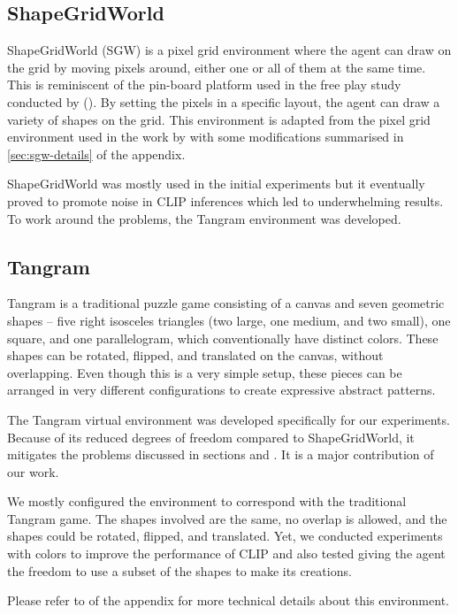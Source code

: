 \subsection{ShapeGridWorld}
\label{sec:sgw}
ShapeGridWorld (SGW) is a pixel grid environment where the agent can draw on the grid by moving pixels around, either one or all of them at the same time.
This is reminiscent of the pin-board platform used in the free play study conducted by \citet{diggs} ().
By setting the pixels in a specific layout, the agent can draw a variety of shapes on the grid.
This environment is adapted from the pixel grid environment used in the work by \citet{rair} with some modifications summarised in \ref{sec:sgw-details} of the appendix.

ShapeGridWorld was mostly used in the initial experiments but it eventually proved to promote noise in CLIP inferences which led to underwhelming results.
To work around the problems, the Tangram environment was developed.

\subsection{Tangram}
\label{sec:tangram}
Tangram is a traditional puzzle game consisting of a canvas and seven geometric shapes -- five right isosceles triangles (two large, one medium, and two small), one square, and one parallelogram, which conventionally have distinct colors.
These shapes can be rotated, flipped, and translated on the canvas, without overlapping.
Even though this is a very simple setup, these pieces can be arranged in very different configurations to create expressive abstract patterns.

The Tangram virtual environment was developed specifically for our experiments.
Because of its reduced degrees of freedom compared to ShapeGridWorld, it mitigates the problems discussed in sections  and .
It is a major contribution of our work.

We mostly configured the environment to correspond with the traditional Tangram game.
The shapes involved are the same, no overlap is allowed, and the shapes could be rotated, flipped, and translated.
Yet, we conducted experiments with colors to improve the performance of CLIP and also tested giving the agent the freedom to use a subset of the shapes to make its creations.

Please refer to  of the appendix for more technical details about this environment.
